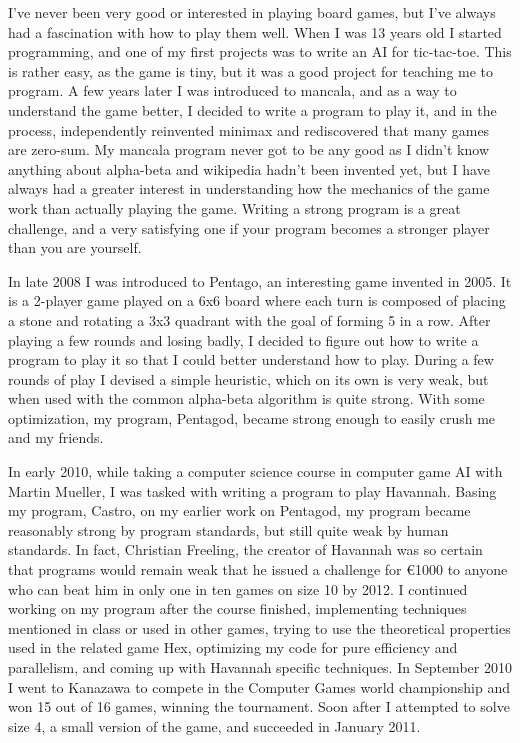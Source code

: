 I've never been very good or interested in playing board games, but I've always had a fascination with how to play them well. When I was 13 years old I started programming, and one of my first projects was to write an AI for tic-tac-toe. This is rather easy, as the game is tiny, but it was a good project for teaching me to program. A few years later I was introduced to mancala, and as a way to understand the game better, I decided to write a program to play it, and in the process, independently reinvented minimax and rediscovered that many games are zero-sum. My mancala program never got to be any good as I didn't know anything about alpha-beta and wikipedia hadn't been invented yet, but I have always had a greater interest in understanding how the mechanics of the game work than actually playing the game. Writing a strong program is a great challenge, and a very satisfying one if your program becomes a stronger player than you are yourself.

In late 2008 I was introduced to Pentago, an interesting game invented in 2005. It is a 2-player game played on a 6x6 board where each turn is composed of placing a stone and rotating a 3x3 quadrant with the goal of forming 5 in a row. After playing a few rounds and losing badly, I decided to figure out how to write a program to play it so that I could better understand how to play. During a few rounds of play I devised a simple heuristic, which on its own is very weak, but when used with the common alpha-beta algorithm is quite strong. With some optimization, my program, Pentagod, became strong enough to easily crush me and my friends.

In early 2010, while taking a computer science course in computer game AI with Martin Mueller, I was tasked with writing a program to play Havannah. Basing my program, Castro, on my earlier work on Pentagod, my program became reasonably strong by program standards, but still quite weak by human standards. In fact, Christian Freeling, the creator of Havannah was so certain that programs would remain weak that he issued a challenge for \euro 1000 to anyone who can beat him in only one in ten games on size 10 by 2012. I continued working on my program after the course finished, implementing techniques mentioned in class or used in other games, trying to use the theoretical properties used in the related game Hex, optimizing my code for pure efficiency and parallelism, and coming up with Havannah specific techniques. In September 2010 I went to Kanazawa to compete in the Computer Games world championship and won 15 out of 16 games, winning the tournament. Soon after I attempted to solve size 4, a small version of the game, and succeeded in January 2011. 

